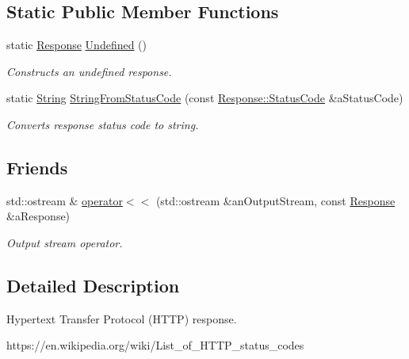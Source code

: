 \subsection*{Static Public Member Functions}
\begin{DoxyCompactItemize}
\item 
static \hyperlink{classostk_1_1io_1_1ip_1_1tcp_1_1http_1_1_response}{Response} \hyperlink{classostk_1_1io_1_1ip_1_1tcp_1_1http_1_1_response_a0a3f62924ffb05edc9bb68351710bb23}{Undefined} ()
\begin{DoxyCompactList}\small\item\em Constructs an undefined response. \end{DoxyCompactList}\item 
static \hyperlink{namespaceostk_1_1io_1_1ip_1_1tcp_1_1http_a88a1b82fb01d02df64ca01ef4058bbef}{String} \hyperlink{classostk_1_1io_1_1ip_1_1tcp_1_1http_1_1_response_a4a593d62047c96eead840c751972ffd4}{String\+From\+Status\+Code} (const \hyperlink{classostk_1_1io_1_1ip_1_1tcp_1_1http_1_1_response_af537657bbf13ea832203957144230c36}{Response\+::\+Status\+Code} \&a\+Status\+Code)
\begin{DoxyCompactList}\small\item\em Converts response status code to string. \end{DoxyCompactList}\end{DoxyCompactItemize}
\subsection*{Friends}
\begin{DoxyCompactItemize}
\item 
std\+::ostream \& \hyperlink{classostk_1_1io_1_1ip_1_1tcp_1_1http_1_1_response_ae3715558aef62c5b9c3c9971e307dd8e}{operator$<$$<$} (std\+::ostream \&an\+Output\+Stream, const \hyperlink{classostk_1_1io_1_1ip_1_1tcp_1_1http_1_1_response}{Response} \&a\+Response)
\begin{DoxyCompactList}\small\item\em Output stream operator. \end{DoxyCompactList}\end{DoxyCompactItemize}


\subsection{Detailed Description}
Hypertext Transfer Protocol (H\+T\+TP) response. 

https\+://en.wikipedia.\+org/wiki/\+List\+\_\+of\+\_\+\+H\+T\+T\+P\+\_\+status\+\_\+codes 

